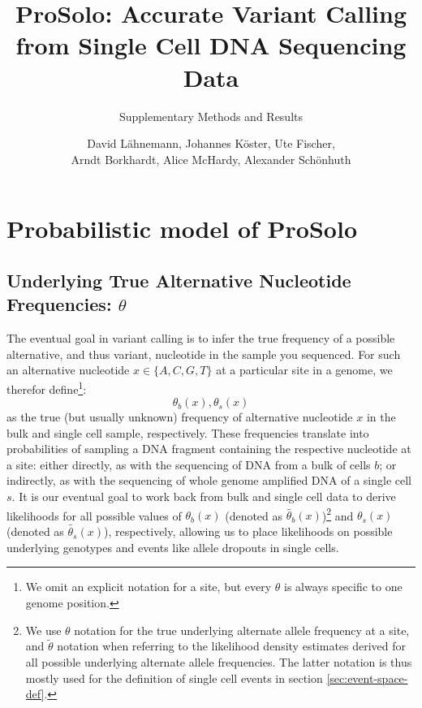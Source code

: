 \documentclass[authoryear,preprint,11pt]{scrartcl}
\begin{document}
\title{ProSolo: Accurate Variant Calling from Single Cell DNA Sequencing Data}
\subtitle{Supplementary Methods and Results}

\author{David Lähnemann, Johannes Köster, Ute Fischer, \\ Arndt Borkhardt, Alice McHardy, Alexander Schönhuth}

\maketitle

\tableofcontents

\section{Probabilistic model of ProSolo}

\subsection{Underlying True Alternative Nucleotide Frequencies: $\theta$}
\label{sec.afs}

The eventual goal in variant calling is to infer the true frequency of a possible alternative, and thus variant, nucleotide in the sample you sequenced.
For such an alternative nucleotide $x\in\{A,C,G,T\}$ at a particular site in a genome, we therefor define\footnote{We omit an explicit notation for a site, but every $\theta$ is always specific to one genome position.}:
\begin{equation}
 \theta_{b}(x), \theta_{s}(x)
\end{equation}
as the true (but usually unknown) frequency of alternative nucleotide $x$ in the bulk and single cell sample, respectively.
These frequencies translate into probabilities of sampling a DNA fragment containing the respective nucleotide at a site:
either directly, as with the sequencing of DNA from a bulk of cells $b$;
or indirectly, as with the sequencing of whole genome amplified DNA of a single cell $s$.
It is our eventual goal to work back from bulk and single cell data to derive likelihoods for all possible values of $\theta_{b}(x)$ (denoted as $\tilde{\theta_b}(x)$)\footnote{We use $\theta$ notation for the true underlying alternate allele frequency at a site, and $\tilde{\theta}$ notation when referring to the likelihood density estimates derived for all possible underlying alternate allele frequencies. The latter notation is thus mostly used for the definition of single cell events in section \ref{sec:event-space-def}.} and $\theta_{s}(x)$ (denoted as $\tilde{\theta_s}(x)$), respectively, allowing us to place likelihoods on possible underlying genotypes and events like allele dropouts in single cells.\\
\end{document}
